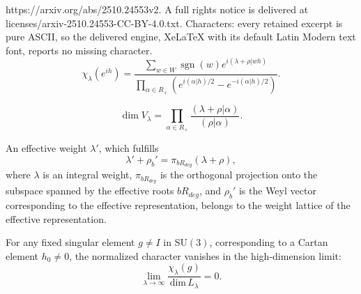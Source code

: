 \documentclass[10pt,a4paper]{amsart}
\DeclareMathOperator{\sgn}{sgn}
\newcommand{\dimL}{\mathrm{dim}\,L_\lambda}
\begin{document}
https://arxiv.org/abs/2510.24553v2. A full rights notice is delivered at licenses/arxiv-2510.24553-CC-BY-4.0.txt. Characters: every retained excerpt is pure ASCII, so the delivered engine, XeLaTeX with its default Latin Modern text font, reports no missing character.
\begin{equation}
    \label{eq:wcf}
    \chi_\lambda(e^{ih}) = \frac{\sum_{w \in W} \sgn(w) e^{i(\lambda + \rho|w h)}}{\prod_{\alpha \in R_+} (e^{i(\alpha|h)/2} - e^{-i(\alpha|h)/2})}.
\end{equation}

\begin{equation}
    \label{eq:dimension_formula}
    \dim V_{\lambda} = \prod_{\alpha \in R_+} \frac{(\lambda + \rho|\alpha)}{(\rho|\alpha)}.
\end{equation}

\begin{lemma}
\label{lemma:weights}
An effective weight $\lambda'$, which fulfills
$$
\lambda' + \rho_b' = \pi_{bR_{deg}}(\lambda + \rho),
$$
where $\lambda$ is an integral weight, $\pi_{bR_{deg}}$ is the orthogonal projection onto the subspace spanned by the effective roots $bR_{deg}$, and $\rho_b'$ is the Weyl vector corresponding to the effective representation, belongs to the weight lattice of the effective representation.
\end{lemma}

\begin{theorem}
For any fixed singular element $g \neq I$ in SU$(3)$, corresponding to a Cartan element $h_0 \neq 0$, the normalized character vanishes in the high-dimension limit:
\[
\lim_{\lambda \to \infty} \frac{\chi_\lambda(g)}{\dimL} = 0.
\]
\end{theorem}
\end{document}
